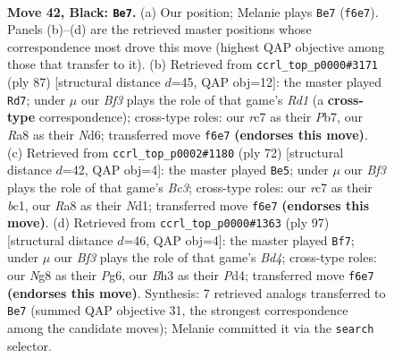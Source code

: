 \documentclass[11pt]{article}
\begin{document}
\clearpage

\begin{figure}[p]\centering
\begin{subfigure}{0.46\textwidth}\centering
\resizebox{\linewidth}{!}{%
\newchessgame
\chessboard[
  setfen={r4kn1/2R5/p1p2b2/8/8/B6b/6R1/1N2K3 b - - 2 42},
  showmover=false,
  pgfstyle=straightmove, color=movearrow, markmove={f6-e7}
]}
\caption{}
\end{subfigure}\hfill
\begin{subfigure}{0.46\textwidth}\centering
\resizebox{\linewidth}{!}{%
\newchessgame
\chessboard[
  setfen={3r4/pp6/3nN1Rp/8/2k1PB2/2b5/P6K/8 b - - 4 44},
  showmover=false,
  pgfstyle=straightmove, color=movearrow, markmove={d8-d7}
]}
\caption{}
\end{subfigure}
\\[4pt]
\begin{subfigure}{0.46\textwidth}\centering
\resizebox{\linewidth}{!}{%
\newchessgame
\chessboard[
  setfen={6k1/8/6p1/3n4/8/r1B5/5KPP/2bN3R w - - 0 37},
  showmover=false,
  pgfstyle=straightmove, color=movearrow, markmove={c3-e5}
]}
\caption{}
\end{subfigure}\hfill
\begin{subfigure}{0.46\textwidth}\centering
\resizebox{\linewidth}{!}{%
\newchessgame
\chessboard[
  setfen={8/3r3k/1R4pp/3b4/3p2R1/8/4K1P1/8 b - - 5 49},
  showmover=false,
  pgfstyle=straightmove, color=movearrow, markmove={d5-f7}
]}
\caption{}
\end{subfigure}
\caption{\textbf{Move 42, Black: \texttt{Be7}.} (a) Our position; Melanie plays \texttt{Be7} (\texttt{f6e7}). Panels (b)--(d) are the retrieved master positions whose correspondence most drove this move (highest QAP objective among those that transfer to it). (b) Retrieved from \texttt{ccrl\_top\_p0000\#3171} (ply 87) [structural distance $d$=45, QAP obj=12]: the master played \texttt{Rd7}; under $\mu$ our \emph{Bf3} plays the role of that game's \emph{Rd1} (a \textbf{cross-type} correspondence); cross-type roles: our \emph{r}c7 as their \emph{P}b7, our \emph{R}a8 as their \emph{N}d6; transferred move \texttt{f6e7} \textbf{(endorses this move)}. (c) Retrieved from \texttt{ccrl\_top\_p0002\#1180} (ply 72) [structural distance $d$=42, QAP obj=4]: the master played \texttt{Be5}; under $\mu$ our \emph{Bf3} plays the role of that game's \emph{Bc3}; cross-type roles: our \emph{r}c7 as their \emph{b}c1, our \emph{R}a8 as their \emph{N}d1; transferred move \texttt{f6e7} \textbf{(endorses this move)}. (d) Retrieved from \texttt{ccrl\_top\_p0000\#1363} (ply 97) [structural distance $d$=46, QAP obj=4]: the master played \texttt{Bf7}; under $\mu$ our \emph{Bf3} plays the role of that game's \emph{Bd4}; cross-type roles: our \emph{N}g8 as their \emph{P}g6, our \emph{B}h3 as their \emph{P}d4; transferred move \texttt{f6e7} \textbf{(endorses this move)}. Synthesis: 7 retrieved analogs transferred to \texttt{Be7} (summed QAP objective 31, the strongest correspondence among the candidate moves); Melanie committed it via the \texttt{search} selector.}
\label{fig:thought-m83}
\end{figure}
\end{document}
